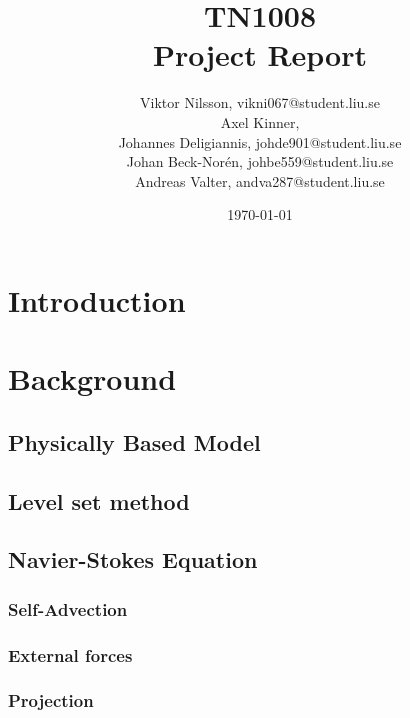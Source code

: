 \documentclass[]{report}   %
\begin{document}
\title{TN1008\\ Project Report}   %
\author{
  Viktor Nilsson, vikni067@student.liu.se 
  \\Axel Kinner,
  \\Johannes Deligiannis, johde901@student.liu.se
  \\Johan Beck-Norén, johbe559@student.liu.se
  \\Andreas Valter, andva287@student.liu.se
	}
        \date{\today}    %
        \maketitle
        
\setcounter{page}{2}



\begingroup
\let\clearpage\relax %
\chapter{Introduction}


\chapter{Background}
\section{Physically Based Model}

\section{Level set method}


\section{Navier-Stokes Equation}

\subsection{Self-Advection}

\subsection{External forces}

\subsection{Projection}

\end{document}
